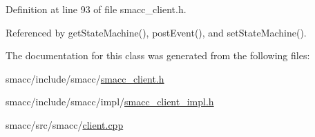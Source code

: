 Definition at line 93 of file smacc\+\_\+client.\+h.



Referenced by get\+State\+Machine(), post\+Event(), and set\+State\+Machine().



The documentation for this class was generated from the following files\+:\begin{DoxyCompactItemize}
\item 
smacc/include/smacc/\hyperlink{smacc__client_8h}{smacc\+\_\+client.\+h}\item 
smacc/include/smacc/impl/\hyperlink{smacc__client__impl_8h}{smacc\+\_\+client\+\_\+impl.\+h}\item 
smacc/src/smacc/\hyperlink{client_8cpp}{client.\+cpp}\end{DoxyCompactItemize}
